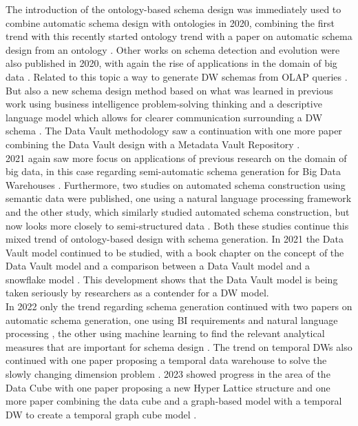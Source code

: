 \documentclass[11pt]{article}
\begin{document}
The introduction of the ontology-based schema design was immediately used to combine automatic schema design with ontologies in 2020, combining the first trend with this recently started ontology trend with a paper on automatic schema design from an ontology \cite{Hajji2020613}. Other works on schema detection and evolution were also published in 2020, with again the rise of applications in the domain of big data \cite{Nogueira202085}. Related to this topic a way to generate DW schemas from OLAP queries \cite{Huo2020337}. But also a new schema design method based on what was learned in previous work using business intelligence problem-solving thinking and a descriptive language model which allows for clearer communication surrounding a DW schema \cite{Takács20201}. The Data Vault methodology saw a continuation with one more paper combining the Data Vault design with a Metadata Vault Repository \cite{Jaksic2020813}. \\

2021 again saw more focus on applications of previous research on the domain of big data, in this case regarding semi-automatic schema generation for Big Data Warehouses \cite{Sautot202128}. Furthermore, two studies on automated schema construction using semantic data were published, one using a natural language processing framework \cite{Sanprasit2021518} and the other study, which similarly studied automated schema construction, but now looks more closely to semi-structured data \cite{Sanprasit2021}. Both these studies continue this mixed trend of ontology-based design with schema generation. In 2021 the Data Vault model continued to be studied, with a book chapter on the concept of the Data Vault model \cite{Gluchowski2021277} and a comparison between a Data Vault model and a snowflake model \cite{Grigoriev2021147}. This development shows that the Data Vault model is being taken seriously by researchers as a contender for a DW model. \\

In 2022 only the trend regarding schema generation continued with two papers on automatic schema generation, one using BI requirements and natural language processing \cite{Pizarro202213}, the other using machine learning to find the relevant analytical measures that are important for schema design \cite{Yang2022173}. The trend on temporal DWs also continued with one paper proposing a temporal data warehouse to solve the slowly changing dimension problem \cite{Phungtua-Eng2022214}. 2023 showed progress in the area of the Data Cube with one paper proposing a new Hyper Lattice structure \cite{Phogat2023697} and one more paper combining the data cube and a graph-based model with a temporal DW to create a temporal graph cube model \cite{Wang20231315}. \\
\end{document}
